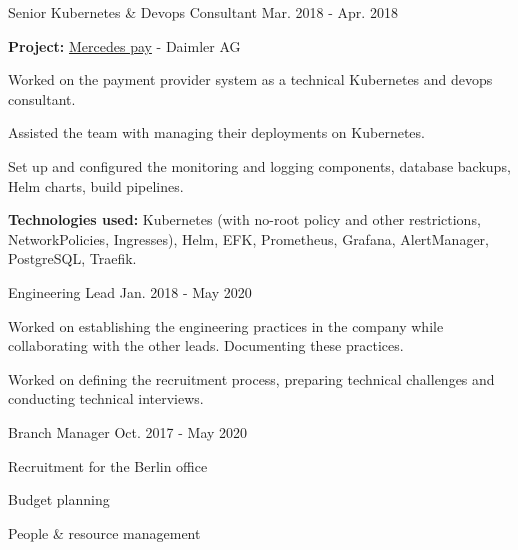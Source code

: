 \begin{cventries}
    \cventry
    {Senior Kubernetes \& Devops Consultant}
    {}
    {}
    {Mar. 2018 - Apr. 2018}
    {
        \begin{cvitems}
            \item {
                \textbf{Project:} \href{https://www.daimler-mobility.com/en/solutions/mobility-ecosystem/portfolio/payment-services/}{Mercedes pay} - Daimler AG
            }
            \newline
            \item {Worked on the payment provider system as a technical Kubernetes and devops consultant.}
            \item {Assisted the team with managing their deployments on Kubernetes.}
            \item {
                Set up and configured the monitoring and logging components, database backups,
                Helm charts, build pipelines.
            }
            \smallskip
            \item {
                \textbf{Technologies used:} Kubernetes (with no-root policy and other restrictions,
                NetworkPolicies, Ingresses), Helm, EFK, Prometheus,
                Grafana, AlertManager, PostgreSQL, Traefik.
            }
        \end{cvitems}
    }

    \cventry
    {Engineering Lead}
    {}
    {}
    {Jan. 2018 - May 2020}
    {
        \begin{cvitems}
            \item {
                Worked on establishing the engineering practices in the company while
                collaborating with the other leads. Documenting these practices.
            }
            \item {
                Worked on defining the recruitment process, preparing technical challenges
                and conducting technical interviews.
            }
        \end{cvitems}
    }

    \cventry
    {Branch Manager}
    {}
    {}
    {Oct. 2017 - May 2020}
    {
        \begin{cvitems}
            \item {Recruitment for the Berlin office}
            \item {Budget planning}
            \item {People \& resource management}
        \end{cvitems}
    }


\end{cventries}
